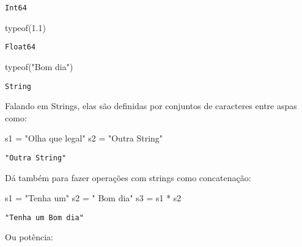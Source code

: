 \documentclass[
  letterpaper,
  DIV=11,
  numbers=noendperiod]{scrreprt}
\newenvironment{Shaded}{\begin{snugshade}}{\end{snugshade}}
\newcommand{\FloatTok}[1]{\textcolor[rgb]{0.68,0.00,0.00}{#1}}
\newcommand{\FunctionTok}[1]{\textcolor[rgb]{0.28,0.35,0.67}{#1}}
\newcommand{\NormalTok}[1]{\textcolor[rgb]{0.00,0.23,0.31}{#1}}
\newcommand{\OperatorTok}[1]{\textcolor[rgb]{0.37,0.37,0.37}{#1}}
\newcommand{\StringTok}[1]{\textcolor[rgb]{0.13,0.47,0.30}{#1}}
\begin{document}
\begin{verbatim}
Int64
\end{verbatim}

\begin{Shaded}
\begin{Highlighting}[]
\FunctionTok{typeof}\NormalTok{(}\FloatTok{1.1}\NormalTok{)}
\end{Highlighting}
\end{Shaded}

\begin{verbatim}
Float64
\end{verbatim}

\begin{Shaded}
\begin{Highlighting}[]
\FunctionTok{typeof}\NormalTok{(}\StringTok{"Bom dia"}\NormalTok{)}
\end{Highlighting}
\end{Shaded}

\begin{verbatim}
String
\end{verbatim}

Falando em Strings, elas são definidas por conjuntos de caracteres entre
aspas como:

\begin{Shaded}
\begin{Highlighting}[]
\NormalTok{s1 }\OperatorTok{=} \StringTok{"Olha que legal"}
\NormalTok{s2 }\OperatorTok{=} \StringTok{"Outra String"}
\end{Highlighting}
\end{Shaded}

\begin{verbatim}
"Outra String"
\end{verbatim}

Dá também para fazer operações com strings como concatenação:

\begin{Shaded}
\begin{Highlighting}[]
\NormalTok{s1 }\OperatorTok{=} \StringTok{"Tenha um"}
\NormalTok{s2 }\OperatorTok{=} \StringTok{" Bom dia"}
\NormalTok{s3 }\OperatorTok{=}\NormalTok{ s1 }\OperatorTok{*}\NormalTok{ s2}
\end{Highlighting}
\end{Shaded}

\begin{verbatim}
"Tenha um Bom dia"
\end{verbatim}

Ou potência:
\end{document}
